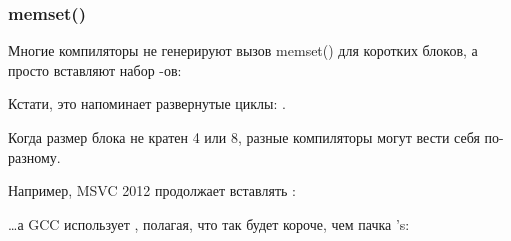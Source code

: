 ﻿\subsubsection{memset()}





Многие компиляторы не генерируют вызов memset() для коротких блоков, а просто вставляют набор \MOV{}-ов:



Кстати, это напоминает развернутые циклы: 
.





Когда размер блока не кратен 4 или 8, разные компиляторы могут вести себя по-разному.


Например, MSVC 2012 продолжает вставлять \MOV:




\dots а GCC использует , полагая, что так будет короче, чем пачка 's:


